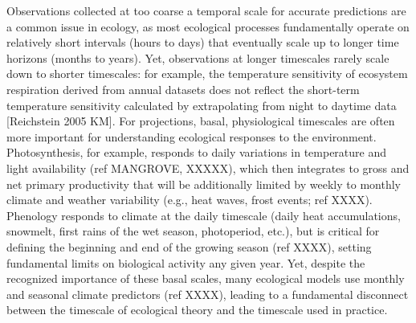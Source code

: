 \documentclass[11pt,a4paper,oneside]{article}
\begin{document}
Observations collected at too coarse a temporal scale for accurate predictions are a common issue in ecology, as most ecological processes fundamentally operate on relatively short intervals (hours to days) that eventually scale up to longer time horizons (months to years). Yet, observations at longer timescales rarely scale down to shorter timescales: for example, the temperature sensitivity of ecosystem respiration derived from annual datasets does not reflect the short-term temperature sensitivity calculated by extrapolating from night to daytime data [Reichstein 2005 KM]. For projections, basal, physiological timescales are often more important for understanding ecological responses to the environment. Photosynthesis, for example, responds to daily variations in temperature and light availability (ref MANGROVE, XXXXX), which then integrates to gross and net primary productivity that will be additionally limited by weekly to monthly climate and weather variability (e.g., heat waves, frost events; ref XXXX). Phenology responds to climate at the daily timescale (daily heat accumulations, snowmelt, first rains of the wet season, photoperiod, etc.), but is critical for defining the beginning and end of the growing season (ref XXXX), setting fundamental limits on biological activity any given year. Yet, despite the recognized importance of these basal scales, many ecological models use monthly and seasonal climate predictors (ref XXXX), leading to a fundamental disconnect between the timescale of ecological theory and the timescale used in practice.\\
\end{document}
